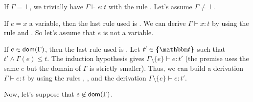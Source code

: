 \documentclass[a4paper]{article}
\theoremstyle{definition}
\begin{document}
  If $\Gamma = \bot$, we trivially have $\Gamma \vdash e:t$ with the rule .
  Let's assume $\Gamma \neq \bot$.

  If $e=x$ a variable, then the last rule used is .
  We can derive $\Gamma \vdash x:t$ by using the rule  and .
  So let's assume that $e$ is not a variable.

  If $e\in\textsf{dom}(\Gamma)$, then the last rule used is .
  Let $t'\in\tsint{\ts}$ such that $t'\land\Gamma(e)\leq t$.
  The induction hypothesis gives $\Gamma\setminus\{e\} \vdash e:t'$
  (the premise uses the same $e$ but the domain of $\Gamma$ is strictly smaller).
  Thus, we can build a derivation $\Gamma \vdash e:t$ by using the rules , ,
   and the derivation $\Gamma\setminus\{e\} \vdash e:t'$.

  Now, let's suppose that $e\not\in\textsf{dom}(\Gamma)$.
\end{document}
